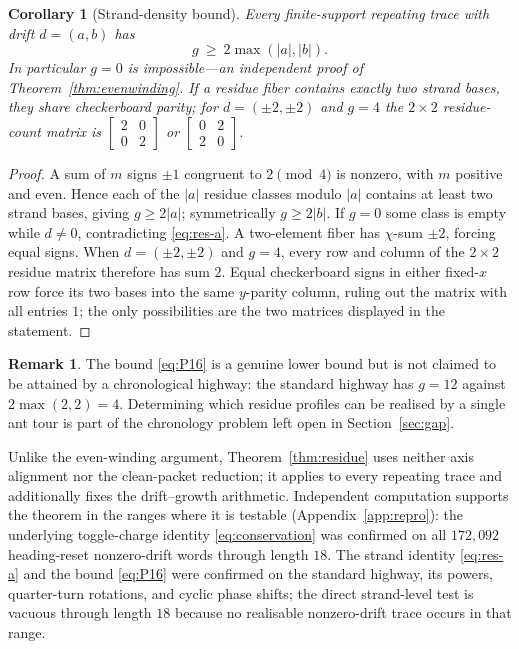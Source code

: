 \documentclass[11pt,reqno]{amsart}
\theoremstyle{plain}
\newtheorem{corollary}[theorem]{Corollary}
\theoremstyle{definition}
\newtheorem{remark}[theorem]{Remark}
\newcommand{\che}{\chi}
\newcommand{\drift}{d}
\newcommand{\growth}{g}
\begin{document}
\begin{corollary}[Strand-density bound]\label{cor:P16}
Every finite-support repeating trace with drift $\drift=(a,b)$ has
\begin{equation}\label{eq:P16}
\growth\ \ge\ 2\max(|a|,|b|).
\end{equation}
In particular $\growth=0$ is impossible---an independent proof of
Theorem~\ref{thm:evenwinding}. If a residue fiber contains exactly two strand bases,
they share checkerboard parity; for $\drift=(\pm2,\pm2)$ and $\growth=4$ the
$2\times2$ residue-count matrix is $\left[\begin{smallmatrix}2&0\\0&2\end{smallmatrix}\right]$
or $\left[\begin{smallmatrix}0&2\\2&0\end{smallmatrix}\right]$.
\end{corollary}

\begin{proof}
A sum of $m$ signs $\pm1$ congruent to $2\pmod4$ is nonzero, with $m$ positive and
even. Hence each of the $|a|$ residue classes modulo $|a|$ contains at least two
strand bases, giving $\growth\ge2|a|$; symmetrically $\growth\ge2|b|$. If $\growth=0$
some class is empty while $\drift\neq0$, contradicting \eqref{eq:res-a}. A two-element
fiber has $\che$-sum $\pm2$, forcing equal signs. When
$\drift=(\pm2,\pm2)$ and $\growth=4$, every row and column of the $2\times2$ residue
matrix therefore has sum $2$. Equal checkerboard signs in either fixed-$x$ row force
its two bases into the same $y$-parity column, ruling out the matrix with all entries
$1$; the only possibilities are the two matrices displayed in the statement.
\end{proof}

\begin{remark}
The bound \eqref{eq:P16} is a genuine lower bound but is not claimed to be attained by
a chronological highway: the standard highway has $\growth=12$ against
$2\max(2,2)=4$. Determining which residue profiles can be realised by a single ant
tour is part of the chronology problem left open in Section~\ref{sec:gap}.
\end{remark}

Unlike the even-winding argument, Theorem~\ref{thm:residue} uses neither axis
alignment nor the clean-packet reduction; it applies to every repeating trace and
additionally fixes the drift--growth arithmetic. Independent computation supports the
theorem in the ranges where it is testable (Appendix~\ref{app:repro}): the underlying
toggle-charge identity \eqref{eq:conservation} was confirmed on all $172{,}092$
heading-reset nonzero-drift words through length $18$. The strand identity
\eqref{eq:res-a} and the bound \eqref{eq:P16} were confirmed on the standard highway,
its powers, quarter-turn rotations, and cyclic phase shifts; the direct strand-level
test is vacuous through
length $18$ because no realisable nonzero-drift trace occurs in that range.
\end{document}
